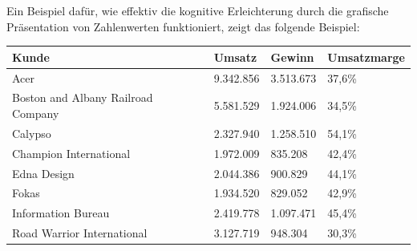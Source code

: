 Ein Beispiel dafür, wie effektiv die kognitive Erleichterung durch die grafische Präsentation von Zahlenwerten funktioniert, zeigt das folgende Beispiel:

\begin{table}[htb]
\centering
\begin{tabular}{|l|l|l|l|}
\hline
\textbf{Kunde}                  & \textbf{Umsatz} & \textbf{Gewinn} & \textbf{Umsatzmarge} \\ \hline
Acer                               & 9.342.856      & 3.513.673             & 37,6\%                     \\ \hline
Boston and Albany Railroad Company & 5.581.529      & 1.924.006             & 34,5\%                     \\ \hline
Calypso                            & 2.327.940      & 1.258.510             & 54,1\%                     \\ \hline
Champion International             & 1.972.009      & 835.208               & 42,4\%                     \\ \hline
Edna Design                        & 2.044.386      & 900.829               & 44,1\%                     \\ \hline
Fokas                              & 1.934.520      & 829.052               & 42,9\%                     \\ \hline
Information Bureau                 & 2.419.778      & 1.097.471             & 45,4\%                     \\ \hline
Road Warrior International         & 3.127.719      & 948.304               & 30,3\%                     \\ \hline

\end{tabular}
\end{table}
